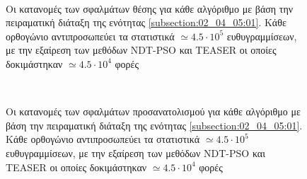 \begin{figure}[!h]\centering
  \begin{subfigure}{\linewidth}
    \vspace{2cm}
    
    \vspace{1cm}
  \end{subfigure}\\%
  \begin{subfigure}{\linewidth}
    \vspace{1cm}
    
    \vspace{1cm}
  \end{subfigure}%
\caption{\small Οι κατανομές των σφαλμάτων θέσης για κάθε αλγόριθμο με βάση
         την πειραματική διάταξη της ενότητας \ref{subsection:02_04_05:01}.
         Κάθε ορθογώνιο αντιπροσωπεύει τα στατιστικά $\simeq 4.5\cdot10^5$
         ευθυγραμμίσεων, με την εξαίρεση των μεθόδων NDT-PSO και TEASER οι
         οποίες δοκιμάστηκαν $\simeq 4.5 \cdot 10^4$ φορές}
\label{fig:appendix:02_04_05:01}
\end{figure}

\begin{figure}[!h]\centering
  \begin{subfigure}{\linewidth}
    \vspace{1cm}
    
    \vspace{1cm}
  \end{subfigure}\\%
  \begin{subfigure}{\linewidth}
    \vspace{1cm}
    
    \vspace{1cm}
  \end{subfigure}%
\caption{\small Οι κατανομές των σφαλμάτων προσανατολισμού για κάθε αλγόριθμο με
         βάση την πειραματική διάταξη της ενότητας
         \ref{subsection:02_04_05:01}.  Κάθε ορθογώνιο αντιπροσωπεύει τα
         στατιστικά $\simeq 4.5\cdot10^5$ ευθυγραμμίσεων, με την εξαίρεση των
         μεθόδων NDT-PSO και TEASER οι οποίες δοκιμάστηκαν $\simeq 4.5 \cdot
         10^4$ φορές}
\label{fig:appendix:02_04_05:02}
\end{figure}
